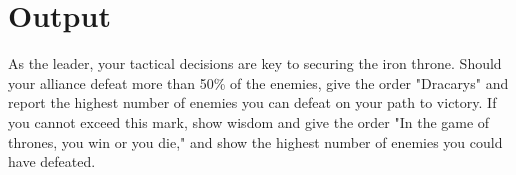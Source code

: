 \section{Output}
As the leader, your tactical decisions are key to securing the iron throne. Should your alliance defeat more than 50\% of the enemies, give the order "Dracarys" and report the highest number of enemies you can defeat on your path to victory. If you cannot exceed this mark, show wisdom and give the order "In the game of thrones, you win or you die," and show the highest number of enemies you could have defeated.

